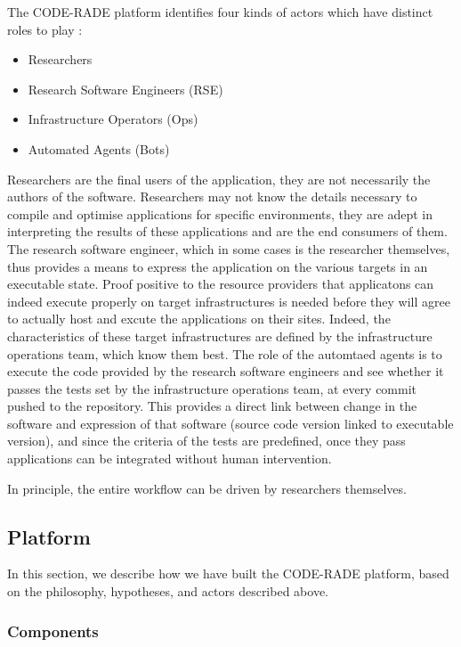 \documentclass[a4paper]{jpconf}
\begin{document}
	The CODE-RADE platform identifies four kinds of actors which have distinct roles to play :
	\begin{itemize}
		\item Researchers
		\item Research Software Engineers (RSE)
		\item Infrastructure Operators (Ops)
		\item Automated Agents (Bots)
	\end{itemize}

    Researchers are the final users of the application, they are not necessarily the authors of
    the software. Researchers may not know the details necessary to compile and optimise
    applications for specific environments, they are adept in interpreting the results of
    these applications and are the end consumers of them. The research software engineer, which in
    some cases is the researcher themselves, thus provides a means to express the application on the
    various targets in an executable state. Proof positive to the resource providers that
    applicatons can indeed execute properly on target infrastructures is needed before they will
    agree to actually host and excute the applications on their sites. Indeed, the characteristics
    of these target infrastructures are defined by the infrastructure operations team, which know
    them best. The role of the automtaed agents is to execute the code provided by the research
    software engineers and see whether it passes the tests set by the infrastructure operations
    team, at every commit pushed to the repository. This provides a direct link between change in
    the software and expression of that software (source code version linked to executable version),
    and since the criteria of the tests are predefined, once they pass applications can be integrated
    without human intervention.

	In principle, the entire workflow can be driven by researchers themselves.

	\subsection{Platform}

    In this section, we describe how we have built the CODE-RADE platform, based on the philosophy,
    hypotheses, and actors described above.

	\subsubsection{Components}
\end{document}
